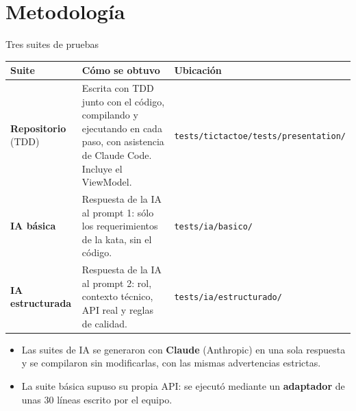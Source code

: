 \documentclass[aspectratio=169,10pt]{beamer}
\newcommand{\repo}{\textbf{Repositorio}}
\newcommand{\iab}{\textbf{IA básica}}
\newcommand{\iae}{\textbf{IA estructurada}}
\begin{document}
\section{Metodología}

\begin{frame}{Tres suites de pruebas}
  \footnotesize
  \begin{tabularx}{\textwidth}{>{\raggedright\arraybackslash}p{2.6cm}X>{\raggedright\arraybackslash}p{4.2cm}}
    \toprule
    \textbf{Suite} & \textbf{Cómo se obtuvo} & \textbf{Ubicación} \\
    \midrule
    \repo{} (TDD) & Escrita con TDD junto con el código, compilando y ejecutando en cada paso, con asistencia de Claude Code. Incluye el ViewModel. & \texttt{tests/tictactoe/}\newline\texttt{tests/presentation/} \\
    \midrule
    \iab{} & Respuesta de la IA al prompt 1: sólo los requerimientos de la kata, sin el código. & \texttt{tests/ia/basico/} \\
    \midrule
    \iae{} & Respuesta de la IA al prompt 2: rol, contexto técnico, API real y reglas de calidad. & \texttt{tests/ia/estructurado/} \\
    \bottomrule
  \end{tabularx}
  \vfill
  \begin{itemize}
    \item Las suites de IA se generaron con \textbf{Claude} (Anthropic) en \alert{una sola respuesta} y se
      compilaron \alert{sin modificarlas}, con las mismas advertencias estrictas.
    \item La suite básica supuso su propia API: se ejecutó mediante un \textbf{adaptador} de unas 30 líneas
      escrito por el equipo.
  \end{itemize}
\end{frame}
\end{document}
